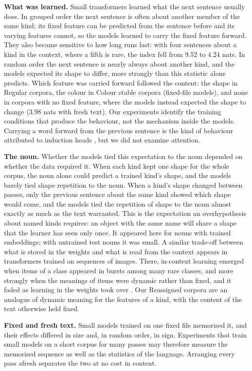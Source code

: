 \textbf{What was learned.} Small transformers learned what the next sentence usually does. In grouped order the next sentence is often about another member of the same kind; its fixed feature can be predicted from the sentence before and its varying features cannot, so the models learned to carry the fixed feature forward. They also became sensitive to how long runs last: with four sentences about a kind in the context, where a fifth is rare, the index fell from 9.52 to 4.24 nats. In random order the next sentence is nearly always about another kind, and the models expected its shape to differ, more strongly than this statistic alone predicts. Which feature was carried forward followed the content: the shape in Regular corpora, the colour in Colour stable corpora (fixed-file models), and none in corpora with no fixed feature, where the models instead expected the shape to change (\textminus{}3.98 nats with fresh text). Our experiments identify the training conditions that produce the behaviour, not the mechanism inside the models. Carrying a word forward from the previous sentence is the kind of behaviour attributed to induction heads \cite{olsson2022}, but we did not examine attention.

\textbf{The noun.} Whether the models tied this expectation to the noun depended on whether the data required it. When each kind kept one shape for the whole corpus, the noun alone could predict a trained kind's shape, and the models barely tied shape repetition to the noun. When a kind's shape changed between passes, only the previous sentence about the same kind showed which shape would come, and the models tied the repetition of shape to the noun almost exactly as much as the text warranted. This is the expectation an overhypothesis about named kinds requires: an object with the same name will share a shape that the learner has seen only once. It appeared here for nouns with trained embeddings; with untrained test nouns it was small. A similar trade-off between what is stored in the weights and what is read from the context appears in transformers trained on sequences of images. There, in-context learning emerged when items of a class appeared in bursts among many rare classes, and more strongly when the meanings of items were dynamic rather than fixed, and it faded as learning in the weights took over \cite{chan2022,singh2023}. Our Reassigned corpora are an analogue of dynamic meaning for the features of a kind, with the content of the text otherwise held fixed.

\textbf{Fixed and fresh text.} Small models trained on one fixed file memorised it, and their effects differed in size and, in random order, in sign. Experiments that train small models on a short corpus for many passes may therefore measure the memorised sequence as well as the statistics of the language. Arranging every pass afresh separates the two at no cost in content.

